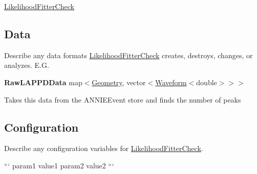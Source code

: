 \hyperlink{classLikelihoodFitterCheck}{Likelihood\-Fitter\-Check}

\subsection*{Data}

Describe any data formats \hyperlink{classLikelihoodFitterCheck}{Likelihood\-Fitter\-Check} creates, destroys, changes, or analyzes. E.\-G.

{\bfseries Raw\-L\-A\-P\-P\-D\-Data} {\ttfamily map$<$\hyperlink{classGeometry}{Geometry}, vector$<$\hyperlink{classWaveform}{Waveform}$<$double$>$$>$$>$}
\begin{DoxyItemize}
\item Takes this data from the {\ttfamily A\-N\-N\-I\-E\-Event} store and finds the number of peaks
\end{DoxyItemize}

\subsection*{Configuration}

Describe any configuration variables for \hyperlink{classLikelihoodFitterCheck}{Likelihood\-Fitter\-Check}.

``` param1 value1 param2 value2 ``` 